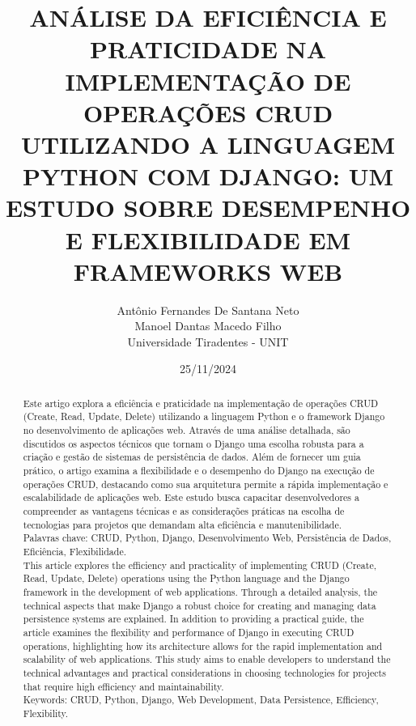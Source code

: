 \documentclass[11pt]{article} %
\title{ANÁLISE DA EFICIÊNCIA E PRATICIDADE NA IMPLEMENTAÇÃO DE OPERAÇÕES CRUD UTILIZANDO A LINGUAGEM PYTHON COM DJANGO: UM ESTUDO SOBRE DESEMPENHO E FLEXIBILIDADE EM FRAMEWORKS WEB}
\author{Antônio Fernandes De Santana Neto\\ Manoel Dantas Macedo Filho \\ Universidade Tiradentes - UNIT}
\date{25/11/2024}
\begin{document}
\maketitle
\begin{abstract}
Este artigo explora a eficiência e praticidade na implementação de operações CRUD (Create, Read, Update, Delete) utilizando a linguagem Python e o framework Django no desenvolvimento de aplicações web. Através de uma análise detalhada, são discutidos os aspectos técnicos que tornam o Django uma escolha robusta para a criação e gestão de sistemas de persistência de dados. Além de fornecer um guia prático, o artigo examina a flexibilidade e o desempenho do Django na execução de operações CRUD, destacando como sua arquitetura permite a rápida implementação e escalabilidade de aplicações web. Este estudo busca capacitar desenvolvedores a compreender as vantagens técnicas e as considerações práticas na escolha de tecnologias para projetos que demandam alta eficiência e manutenibilidade.\\
Palavras chave: CRUD, Python, Django, Desenvolvimento Web, Persistência de Dados, Eficiência, Flexibilidade. \\

This article explores the efficiency and practicality of implementing CRUD (Create, Read, Update, Delete) operations using the Python language and the Django framework in the development of web applications. Through a detailed analysis, the technical aspects that make Django a robust choice for creating and managing data persistence systems are explained. In addition to providing a practical guide, the article examines the flexibility and performance of Django in executing CRUD operations, highlighting how its architecture allows for the rapid implementation and scalability of web applications. This study aims to enable developers to understand the technical advantages and practical considerations in choosing technologies for projects that require high efficiency and maintainability.\\ 
Keywords: CRUD, Python, Django, Web Development, Data Persistence, Efficiency, Flexibility.\\
\end{abstract}


\maketitle
\end{document}
